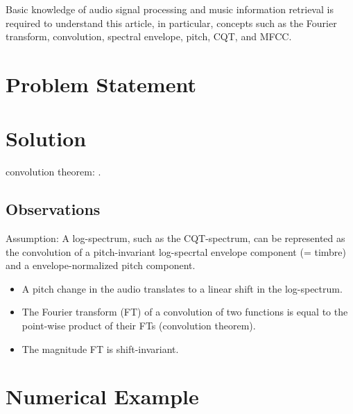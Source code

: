 \documentclass[journal]{IEEEtran}
\begin{document}
Basic knowledge of audio signal processing and music information retrieval is required to understand this article, in particular, concepts such as the Fourier transform, convolution, spectral envelope, pitch, CQT, and MFCC.


\section{Problem Statement}

% 


\section{Solution}


convolution theorem: \cite{proakis1995}.

\subsection{Observations}

Assumption: A log-spectrum, such as the CQT-spectrum, can be represented as the convolution of a pitch-invariant log-specrtal envelope component (= timbre) and a envelope-normalized pitch component.

\begin{itemize}
\item A pitch change in the audio translates to a linear shift in the log-spectrum.
\item The Fourier transform (FT) of a convolution of two functions is equal to the point-wise product of their FTs (convolution theorem).
\item The magnitude FT is shift-invariant.
\end{itemize}



\section{Numerical Example}
\end{document}
